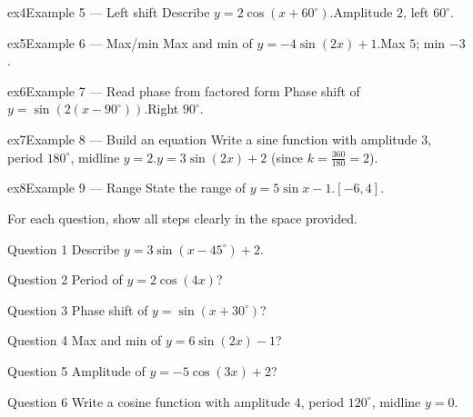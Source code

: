\documentclass[11pt]{article}
\begin{document}
\begin{example}{ex4}{Example 5 --- Left shift}
Describe $y=2\cos(x+60^\circ)$.\soln Amplitude $2$, left $60^\circ$.
\end{example}

\begin{example}{ex5}{Example 6 --- Max/min}
Max and min of $y=-4\sin(2x)+1$.\soln Max $5$; min $-3$.
\end{example}

\begin{example}{ex6}{Example 7 --- Read phase from factored form}
Phase shift of $y=\sin(2(x-90^\circ))$.\soln Right $90^\circ$.
\end{example}

\begin{example}{ex7}{Example 8 --- Build an equation}
Write a sine function with amplitude $3$, period $180^\circ$, midline $y=2$.\soln $y=3\sin(2x)+2$ (since $k=\tfrac{360}{180}=2$).
\end{example}

\begin{example}{ex8}{Example 9 --- Range}
State the range of $y=5\sin x-1$.\soln $[-6,4]$.
\end{example}

\clearpage
{}
For each question, show all steps clearly in the space provided.

\begin{qbox}{Question 1}
Describe $y=3\sin(x-45^\circ)+2$.\workspace{2.4cm}
\end{qbox}

\begin{qbox}{Question 2}
Period of $y=2\cos(4x)$?\workspace{2.4cm}
\end{qbox}

\begin{qbox}{Question 3}
Phase shift of $y=\sin(x+30^\circ)$?\workspace{2.4cm}
\end{qbox}

\begin{qbox}{Question 4}
Max and min of $y=6\sin(2x)-1$?\workspace{2.4cm}
\end{qbox}

\begin{qbox}{Question 5}
Amplitude of $y=-5\cos(3x)+2$?\workspace{2.4cm}
\end{qbox}

\begin{qbox}{Question 6}
Write a cosine function with amplitude $4$, period $120^\circ$, midline $y=0$.\workspace{2.4cm}
\end{qbox}
\end{document}
